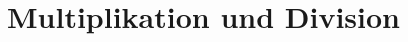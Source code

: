 \renewcommand{\subdir}{MultiplikationUndDivision/}

\ifproblem
\section{Multiplikation und Division}
\fi



